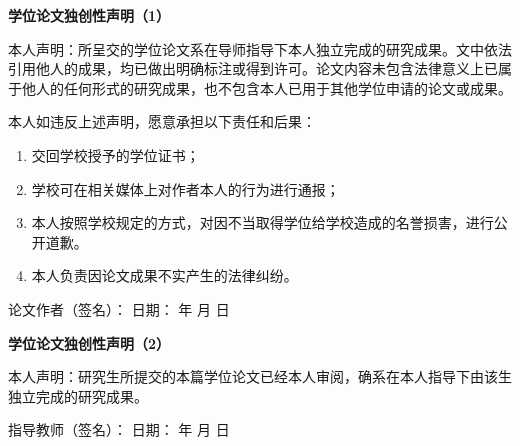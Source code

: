 \documentclass[UTF8, scheme=chinese, openany, oneside]{ctexbook}
\begin{document}
\vspace{0.5cm}

\clearpage


\begin{center}
    { \bfseries 学位论文独创性声明（1）}
\end{center}

\vspace{0.2cm}
 
本人声明：所呈交的学位论文系在导师指导下本人独立完成的研究成果。文中依法引用他人的成果，均已做出明确标注或得到许可。论文内容未包含法律意义上已属于他人的任何形式的研究成果，也不包含本人已用于其他学位申请的论文或成果。

\noindent 本人如违反上述声明，愿意承担以下责任和后果：
\begin{enumerate}[label=\arabic*．, leftmargin=2.5em, itemsep=0pt, topsep=5pt]
    \item 交回学校授予的学位证书；
    \item 学校可在相关媒体上对作者本人的行为进行通报；
    \item 本人按照学校规定的方式，对因不当取得学位给学校造成的名誉损害，进行公开道歉。
    \item 本人负责因论文成果不实产生的法律纠纷。
\end{enumerate}

\vspace{0.8cm}
\noindent 论文作者（签名）： \underline{\hspace{3.5cm}} \hfill 日期： \quad 年 \quad 月 \quad 日

\vspace{1.2cm}
\begin{center}
    { \bfseries 学位论文独创性声明（2）}
\end{center}

\vspace{0.2cm}
\noindent 本人声明：研究生所提交的本篇学位论文已经本人审阅，确系在本人指导下由该生独立完成的研究成果。

\vspace{0.8cm}
\noindent 指导教师（签名）： \underline{\hspace{3.5cm}} \hfill 日期： \quad 年 \quad 月 \quad 日
\end{document}
